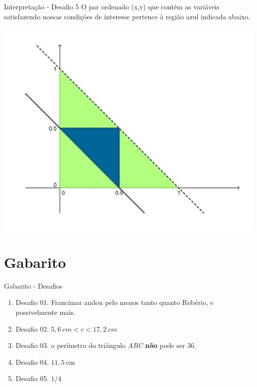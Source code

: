 \documentclass[12pt]{beamer}
\begin{document}
\begin{frame}{Interpretação - Desafio 5}
	O par ordenado (x,y) que contém as variáveis satisfazendo nossas condições de interesse pertence à região azul indicada abaixo.
	
	\begin{center}
		\includegraphics[scale=0.4]{imagens/solucao_desafio5}
	\end{center}
\end{frame}


\section{Gabarito}

\begin{frame}{Gabarito - Desafios}
	\begin{enumerate}
		\item Desafio 01. Francimar andou pelo menos tanto quanto Robério, e possivelmente mais.
		
		\item Desafio 02. $5,6\ cm < c < 17,2\ cm$
		
		\item Desafio 03. o perímetro do triângulo \textit{ABC} \textbf{não} pode ser 36.
		
		\item Desafio 04. $11,5\ $cm
		
		\item Desafio 05. ${1}/{4}$
	\end{enumerate}
\end{frame}
\end{document}
